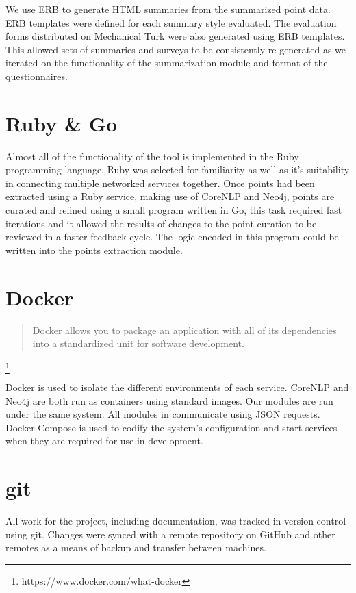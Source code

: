     We use ERB to generate HTML summaries from the summarized point data. ERB templates were defined for each summary style evaluated. The evaluation forms distributed on Mechanical Turk were also generated using ERB templates. This allowed sets of summaries and surveys to be consistently re-generated as we iterated on the functionality of the summarization module and format of the questionnaires.

  \tocless\section{Ruby \& Go}
    Almost all of the functionality of the tool is implemented in the Ruby programming language. Ruby was selected for familiarity as well as it's suitability in connecting multiple networked services together. Once points had been extracted using a Ruby service, making use of CoreNLP and Neo4j, points are curated and refined using a small program written in Go, this task required fast iterations and it allowed the results of changes to the point curation to be reviewed in a faster feedback cycle. The logic encoded in this program could be written into the points extraction module.

  \tocless\section{Docker}
    \blockquote{Docker allows you to package an application with all of its dependencies into a standardized unit for software development.} \footnote{https://www.docker.com/what-docker}

    Docker is used to isolate the different environments of each service. CoreNLP and Neo4j are both run as containers using standard images. Our modules are run under the same system. All modules in communicate using JSON requests. Docker Compose is used to codify the system's configuration and start services when they are required for use in development.

  \tocless\section{git}
    All work for the project, including documentation, was tracked in version control using git. Changes were synced with a remote repository on GitHub and other remotes as a means of backup and transfer between machines.
